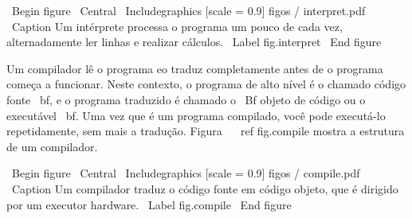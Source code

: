 \documentclass[10pt]{book}
\begin{document}
\ Begin {figure}
\ Central
{\ Includegraphics [scale = 0.9] {figos / interpret.pdf}}
\ Caption {Um intérprete processa o programa um pouco de cada vez,
alternadamente ler linhas e realizar cálculos.}
\ Label {} fig.interpret
\ End {figure}

Um compilador lê o programa eo traduz completamente antes de o
programa começa a funcionar. Neste contexto, o programa de alto nível é
o chamado código fonte {\ bf}, e o programa traduzido é chamado o
{\ Bf objeto de código} ou {o executável \ bf}. Uma vez que é um programa
compilado, você pode executá-lo repetidamente, sem mais a tradução.
Figura ~ \ ref {fig.compile} mostra a estrutura de um compilador.

\ Begin {figure}
\ Central
{\ Includegraphics [scale = 0.9] {figos / compile.pdf}}
\ Caption {Um compilador traduz o código fonte em código objeto, que é
dirigido por um executor hardware.}
\ Label {} fig.compile
\ End {figure}
\end{document}
